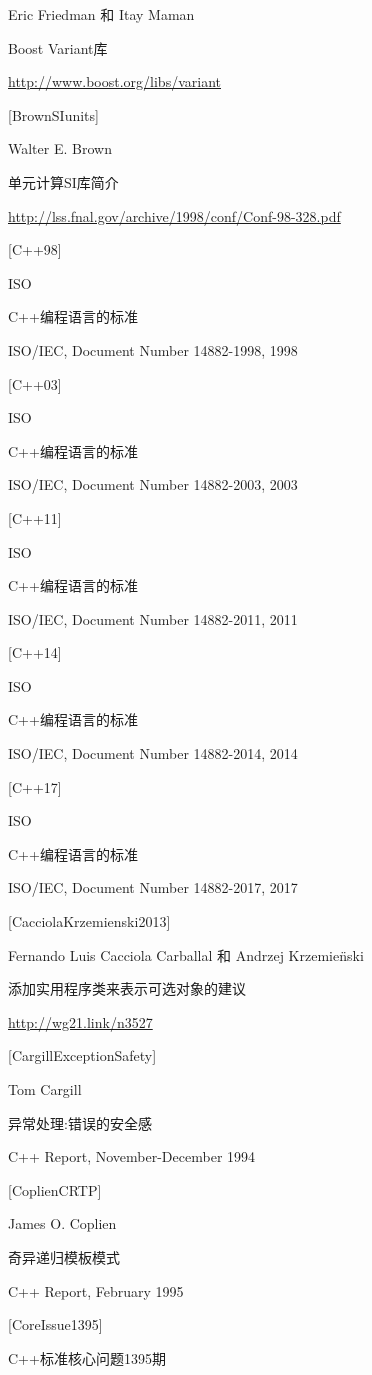 Eric Friedman 和 Itay Maman

Boost Variant库

\url{http://www.boost.org/libs/variant}

{[BrownSIunits]}

Walter E. Brown

单元计算SI库简介

\url{http://lss.fnal.gov/archive/1998/conf/Conf-98-328.pdf}

{[C++98]}

ISO

C++编程语言的标准

ISO/IEC, Document Number 14882-1998, 1998

{[C++03]}

ISO

C++编程语言的标准

ISO/IEC, Document Number 14882-2003, 2003

{[C++11]}

ISO

C++编程语言的标准

ISO/IEC, Document Number 14882-2011, 2011

{[C++14]}

ISO

C++编程语言的标准

ISO/IEC, Document Number 14882-2014, 2014

{[C++17]}

ISO

C++编程语言的标准

ISO/IEC, Document Number 14882-2017, 2017

{[CacciolaKrzemienski2013]}

Fernando Luis Cacciola Carballal 和 Andrzej Krzemie{\"n}ski

添加实用程序类来表示可选对象的建议

\url{http://wg21.link/n3527}

{[CargillExceptionSafety]}

Tom Cargill

异常处理:错误的安全感

C++ Report, November-December 1994

{[CoplienCRTP]}

James O. Coplien

奇异递归模板模式

C++ Report, February 1995

{[CoreIssue1395]}

C++标准核心问题1395期

